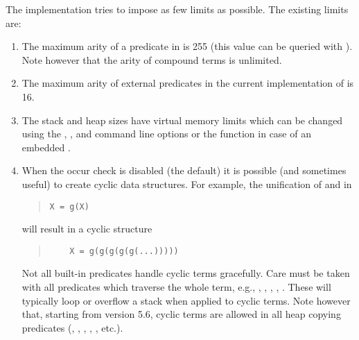 The {\eclipse} implementation tries to impose as few limits as possible.
The existing limits are:
\begin{enumerate}
\item The maximum arity of a predicate in {\eclipse} is 255
(this value can be queried with ).
Note however that the arity of compound terms is unlimited.

\item The maximum arity of external predicates in the current implementation
of {\eclipse} is 16.

\item The stack and heap sizes have virtual memory limits which can be
changed using the , ,  and 
command line options or the  function in case of an
embedded {\eclipse}.

\item {}When the occur check is disabled (the default)
it is possible (and sometimes useful) to create cyclic data structures.
For example, the unification of  and  in
\begin{quote}
\begin{verbatim}
X = g(X)
\end{verbatim}
\end{quote}
will result in a cyclic structure
\begin{quote}
\begin{verbatim}
    X = g(g(g(g(g(...)))))
\end{verbatim}
\end{quote}
Not all {\eclipse} built-in predicates handle cyclic terms gracefully.
Care must be taken with all predicates which traverse the whole term, e.g.,
,
,
,
,
.
These will typically loop or overflow a stack when applied to cyclic terms.
Note however that, starting from version 5.6, cyclic terms are allowed in all
heap copying predicates (, ,
, , , etc.).

\end{enumerate}
